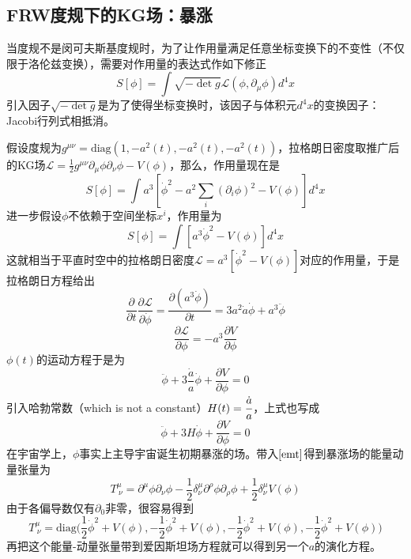 \documentclass[a4paper,11pt]{ctexart}
\newcommand{\beq}{\begin{equation}}
\newcommand{\eeq}{\end{equation}}
\newcommand{\lag}{\mathcal{L}}
\newcommand{\diag}{\mathrm{diag}}
\begin{document}
\subsection{FRW度规下的KG场：暴涨}
当度规不是闵可夫斯基度规时，为了让作用量满足任意坐标变换下的不变性（不仅限于洛伦兹变换），需要对作用量的表达式作如下修正
\beq
S[\phi] = \int \sqrt{ - \det g} \lag(\phi,\partial_\mu \phi) d^4 x
\eeq
引入因子$\sqrt{ - \det g}$是为了使得坐标变换时，该因子与体积元$d^4 x$的变换因子：Jacobi行列式相抵消。
\par
假设度规为$g^{\mu \nu} = \diag(1,-a^2(t),-a^2(t),-a^2(t))$，拉格朗日密度取推广后的KG场$\lag = \frac{1}{2} g^{\mu \nu} \partial_\mu \phi \partial_\nu \phi - V(\phi)$，那么，作用量现在是
\beq
S[\phi] = \int a^3 [\dot{\phi}^2 - a^2 \sum_i (\partial_i \phi)^2 - V(\phi)]d^4 x
\eeq
进一步假设$\phi$不依赖于空间坐标$x^i$，作用量为
\beq
S[\phi] = \int [a^3 \dot{\phi}^2 - V(\phi)]d^4 x
\eeq
这就相当于平直时空中的拉格朗日密度$\lag = a^3 [\dot{\phi}^2 - V(\phi)]$对应的作用量，于是拉格朗日方程给出
\beq
\frac{\partial}{\partial t} \frac{\partial \lag}{\partial \dot{\phi}} = \frac{\partial (a^3 \dot{\phi})}{\partial t} = 3a^2 \dot{a} \dot{\phi} + a^3 \ddot{\phi}
\eeq
\beq
\frac{\partial \lag}{\partial \phi} = - a^3 \frac{\partial V}{\partial \phi}
\eeq
$\phi (t)$的运动方程于是为
\beq
\ddot{\phi} + 3\frac{\dot{a}}{a} \dot{\phi} + \frac{\partial V}{\partial \phi} = 0
\eeq
引入哈勃常数（which is not a constant）$H(t) = \cfrac{\dot{a}}{a}$，上式也写成
\beq
\ddot{\phi} + 3H \dot{\phi} + \frac{\partial V}{\partial \phi} = 0
\eeq
在宇宙学上，$\phi$事实上主导宇宙诞生初期暴涨的场。带入$\cref{emt}$得到暴涨场的能量动量张量为
\beq
T^\mu_{\ \nu} = \partial^\mu \phi \partial_\nu \phi - \frac{1}{2} \delta^\mu_\nu \partial^\rho \phi \partial_\rho \phi + \frac{1}{2} \delta^\mu_\nu V(\phi)
\eeq
由于各偏导数仅有$\partial_0$非零，很容易得到
\beq
T^\mu_{\ \nu} = \diag \big(\frac{1}{2}\dot{\phi}^2 + V(\phi),-\frac{1}{2}\dot{\phi}^2 + V(\phi),-\frac{1}{2}\dot{\phi}^2 + V(\phi),-\frac{1}{2}\dot{\phi}^2 + V(\phi)\big)
\eeq
再把这个能量-动量张量带到爱因斯坦场方程就可以得到另一个$a$的演化方程。
\end{document}

